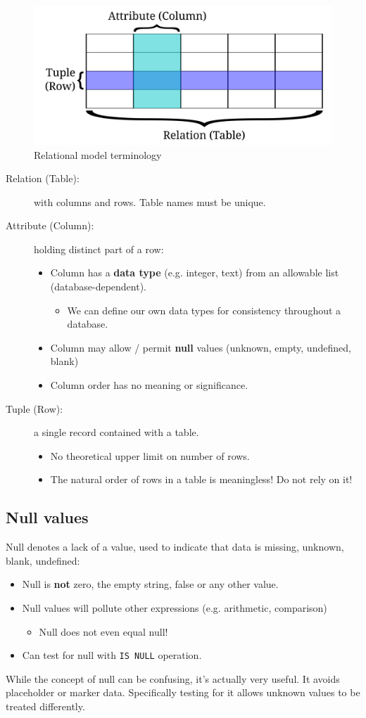 \begin{figure}[htbp]
  \centering
  \includegraphics[width=0.5\linewidth]{rdbms_terms}
  \caption{Relational model terminology}
  \label{fig:rdbms-terms}
\end{figure}

\begin{description}
\item[Relation (Table):] with columns and rows. Table names must be unique.
\item[Attribute (Column):] holding distinct part of a row: 
  \begin{itemize}
  \item Column has a \textbf{data type} (e.g. integer, text) from an allowable list (database-dependent).
    \begin{itemize}
    \item We can define our own data types for consistency throughout a database.
    \end{itemize}
  \item Column may allow / permit \textbf{null} values (unknown, empty, undefined, blank)
  \item Column order has no meaning or significance.
  \end{itemize}
\item[Tuple (Row):] a single record contained with a table.
  \begin{itemize}
  \item No theoretical upper limit on number of rows.
  \item The natural order of rows in a table is meaningless!  Do not rely on it!
  \end{itemize}
\end{description}

\subsection{Null values}

Null denotes a lack of a value, used to indicate that data is missing, unknown, blank, undefined:
\begin{itemize}
\item Null is \textbf{not} zero, the empty string, false or any other value.
\item Null values will pollute other expressions (e.g. arithmetic, comparison)
  \begin{itemize}
  \item Null does not even equal null!
  \end{itemize}
\item Can test for null with \texttt{IS NULL} operation.
\end{itemize}
While the concept of null can be confusing, it's actually very useful.
It avoids placeholder or marker data.
Specifically testing for it allows unknown values to be treated differently. 

